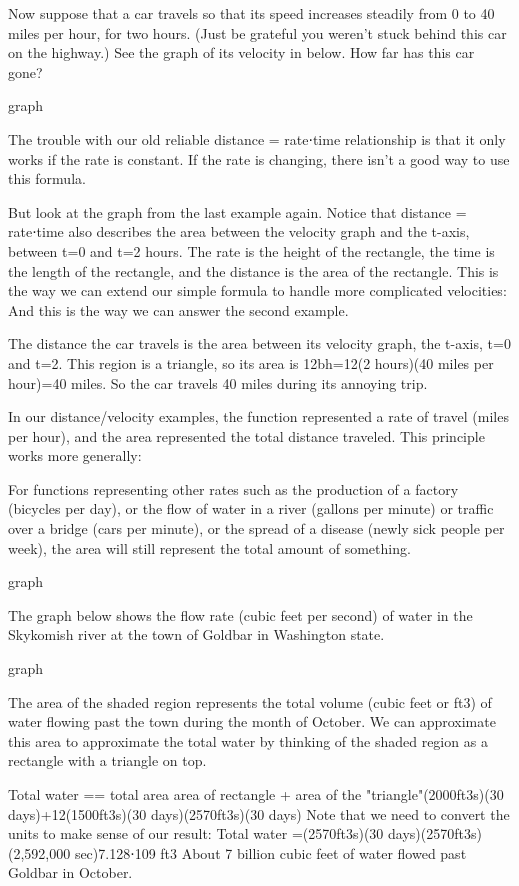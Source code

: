 \begin{example}
Now suppose that a car travels so that its speed increases steadily from 0 to 40 miles per hour, for two hours. (Just be grateful you weren’t stuck behind this car on the highway.) See the graph of its velocity in below. How far has this car gone?

graph

\begin{solution}
The trouble with our old reliable distance = rate⋅time relationship is that it only works if the rate is constant. If the rate is changing, there isn’t a good way to use this formula.

But look at the graph from the last example again. Notice that distance = rate⋅time also describes the area between the velocity graph and the t-axis, between t=0 and t=2 hours. The rate is the height of the rectangle, the time is the length of the rectangle, and the distance is the area of the rectangle. This is the way we can extend our simple formula to handle more complicated velocities: And this is the way we can answer the second example.

The distance the car travels is the area between its velocity graph, the t-axis, t=0 and t=2. This region is a triangle, so its area is
12bh=12(2 hours)(40 miles per hour)=40 miles.
So the car travels 40 miles during its annoying trip.
\end{solution}\end{example}

In our distance/velocity examples, the function represented a rate of travel (miles per hour), and the area represented the total distance traveled. This principle works more generally:

For functions representing other rates such as the production of a factory (bicycles per day), or the flow of water in a river (gallons per minute) or traffic over a bridge (cars per minute), or the spread of a disease (newly sick people per week), the area will still represent the total amount of something.

graph
\begin{example}
The graph below shows the flow rate (cubic feet per second) of water in the Skykomish river at the town of Goldbar in Washington state.

graph
\begin{solution}
The area of the shaded region represents the total volume (cubic feet or ft3) of water flowing past the town during the month of October. We can approximate this area to approximate the total water by thinking of the shaded region as a rectangle with a triangle on top.

Total water =\approx   \approx   = total area area of rectangle + area of the "triangle"(2000ft3s)(30 days)+12(1500ft3s)(30 days)(2570ft3s)(30 days)
Note that we need to convert the units to make sense of our result:
Total water \approx   =\approx   (2570ft3s)(30 days)(2570ft3s)(2,592,000 sec)7.128⋅109 ft3
About 7 billion cubic feet of water flowed past Goldbar in October.
\end{solution}\end{example}


